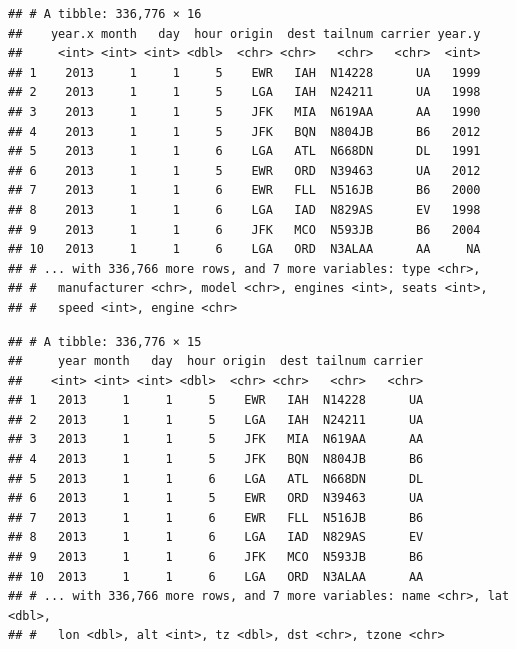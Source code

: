 \documentclass[]{book}
\newenvironment{Shaded}{\begin{snugshade}}{\end{snugshade}}
\newcommand{\KeywordTok}[1]{\textcolor[rgb]{0.13,0.29,0.53}{\textbf{{#1}}}}
\newcommand{\DataTypeTok}[1]{\textcolor[rgb]{0.13,0.29,0.53}{{#1}}}
\newcommand{\StringTok}[1]{\textcolor[rgb]{0.31,0.60,0.02}{{#1}}}
\newcommand{\CommentTok}[1]{\textcolor[rgb]{0.56,0.35,0.01}{\textit{{#1}}}}
\newcommand{\NormalTok}[1]{{#1}}
\theoremstyle{definition}
\theoremstyle{definition}
\theoremstyle{remark}
\begin{document}
\begin{Shaded}
\end{Shaded}

\begin{verbatim}
## # A tibble: 336,776 × 16
##    year.x month   day  hour origin  dest tailnum carrier year.y
##     <int> <int> <int> <dbl>  <chr> <chr>   <chr>   <chr>  <int>
## 1    2013     1     1     5    EWR   IAH  N14228      UA   1999
## 2    2013     1     1     5    LGA   IAH  N24211      UA   1998
## 3    2013     1     1     5    JFK   MIA  N619AA      AA   1990
## 4    2013     1     1     5    JFK   BQN  N804JB      B6   2012
## 5    2013     1     1     6    LGA   ATL  N668DN      DL   1991
## 6    2013     1     1     5    EWR   ORD  N39463      UA   2012
## 7    2013     1     1     6    EWR   FLL  N516JB      B6   2000
## 8    2013     1     1     6    LGA   IAD  N829AS      EV   1998
## 9    2013     1     1     6    JFK   MCO  N593JB      B6   2004
## 10   2013     1     1     6    LGA   ORD  N3ALAA      AA     NA
## # ... with 336,766 more rows, and 7 more variables: type <chr>,
## #   manufacturer <chr>, model <chr>, engines <int>, seats <int>,
## #   speed <int>, engine <chr>
\end{verbatim}

\begin{Shaded}
\end{Shaded}

\begin{verbatim}
## # A tibble: 336,776 × 15
##     year month   day  hour origin  dest tailnum carrier
##    <int> <int> <int> <dbl>  <chr> <chr>   <chr>   <chr>
## 1   2013     1     1     5    EWR   IAH  N14228      UA
## 2   2013     1     1     5    LGA   IAH  N24211      UA
## 3   2013     1     1     5    JFK   MIA  N619AA      AA
## 4   2013     1     1     5    JFK   BQN  N804JB      B6
## 5   2013     1     1     6    LGA   ATL  N668DN      DL
## 6   2013     1     1     5    EWR   ORD  N39463      UA
## 7   2013     1     1     6    EWR   FLL  N516JB      B6
## 8   2013     1     1     6    LGA   IAD  N829AS      EV
## 9   2013     1     1     6    JFK   MCO  N593JB      B6
## 10  2013     1     1     6    LGA   ORD  N3ALAA      AA
## # ... with 336,766 more rows, and 7 more variables: name <chr>, lat <dbl>,
## #   lon <dbl>, alt <int>, tz <dbl>, dst <chr>, tzone <chr>
\end{verbatim}
\end{document}
